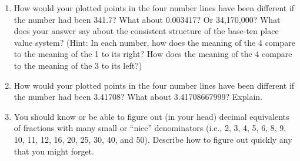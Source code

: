 \begin{problems}
\begin{enumerate}

\vspace{0.8cm}


\vspace{1.2cm}


\vspace{0.4cm}

\item How would your plotted points in the four number lines have been different if the number had been 341.7?  What about 0.003417?  Or 34,170,000?   What does your answer say about the consistent structure of the base-ten place value system?  (Hint:  In each number, how does the meaning of the 4 compare to the meaning of the 1 to its right?   How does the meaning of the 4 compare to the meaning of the 3 to its left?)  

\item How would your plotted points in the four number lines have been different if the number had been 3.41708?  What about 3.41708667999?  Explain.  

\item You should know or be able to figure out (in your head) decimal equivalents of fractions with many small  or ``nice'' denominators (i.e., 2, 3, 4, 5, 6, 8, 9, 10, 11, 12, 16, 20, 25, 30, 40, and 50).  Describe how to figure out quickly any that you might forget.  


\end{enumerate}
\end{problems}
